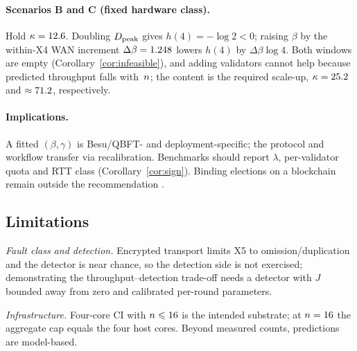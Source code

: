 \paragraph{Scenarios B and C (fixed hardware class).}
Hold $\kappa=12.6$. Doubling $D_{\mathrm{peak}}$ gives $h(4)=-\log2<0$; raising
$\beta$ by the within-X4 WAN increment $\Delta\beta=1.248$ lowers
$h(4)$ by $\Delta\beta\log4$. Both windows are empty
(Corollary~\ref{cor:infeasible}), and adding validators cannot help because
predicted throughput falls with~$n$; the content is the required scale-up,
$\kappa=25.2$ and $\approx71.2$, respectively.

\paragraph{Implications.}
A fitted $(\beta,\gamma)$ is Besu/QBFT- and deployment-specific; the \RNM{}
protocol and workflow transfer via recalibration. Benchmarks should report
$\lambda$, per-validator quota and RTT class (Corollary~\ref{cor:sign}). Binding
elections on a blockchain remain outside the recommendation
\cite{springall2014,specter2020,park2021}.

\subsection{Limitations}
\label{sec:limitations}

\emph{Fault class and detection.} Encrypted transport limits X5 to
omission/duplication and the detector is near chance, so the detection side is
not exercised; demonstrating the throughput--detection trade-off needs a
detector with $J$ bounded away from zero and calibrated per-round parameters.

\emph{Infrastructure.} Four-core CI with $n\leqslant16$ is the
intended substrate; at $n=16$ the aggregate cap equals the four
host cores. Beyond measured counts, predictions are model-based.
